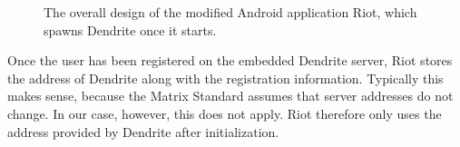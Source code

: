 \begin{figure}
	\centering
	\resizebox{0.5\linewidth}{!}{}
	\caption{%
		The overall design of the modified Android application Riot, which spawns Dendrite once it starts.
	}%
	\label{fig:design_constraints}
\end{figure}

Once the user has been registered on the embedded Dendrite server, Riot stores the address of Dendrite along with the registration information.
Typically this makes sense, because the Matrix Standard assumes that server addresses do not change.
In our case, however, this does not apply.
Riot therefore only uses the address provided by Dendrite after initialization.


